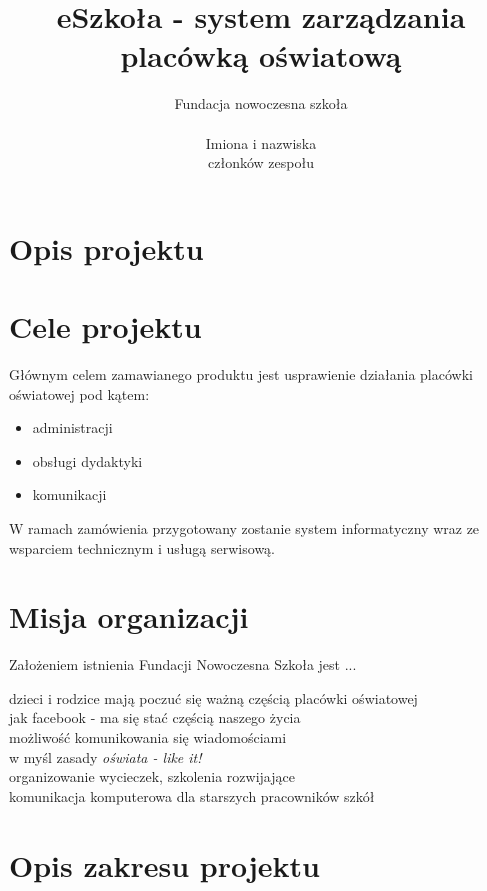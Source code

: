 \documentclass{article}
\author{Fundacja nowoczesna szkoła\\\\
Imiona i nazwiska\\członków zespołu} %
\title{eSzkoła - system zarządzania placówką oświatową}
\begin{document}
\maketitle
\newpage
\tableofcontents
\newpage

\section{Opis projektu}

\section{Cele projektu}
Głównym celem zamawianego produktu jest usprawienie działania placówki oświatowej pod kątem:
\begin{itemize}
    \item administracji
    \item obsługi dydaktyki
    \item komunikacji
\end{itemize}

W ramach zamówienia przygotowany zostanie system informatyczny wraz ze wsparciem technicznym i usługą serwisową.


\section{Misja organizacji}
Założeniem istnienia Fundacji Nowoczesna Szkoła jest ... %

dzieci i rodzice mają poczuć się ważną częścią placówki oświatowej\\
jak facebook - ma się stać częścią naszego życia\\
możliwość komunikowania się wiadomościami\\
w myśl zasady \textit{ oświata - like it!}\\
organizowanie wycieczek, szkolenia rozwijające \\
komunikacja komputerowa dla starszych pracowników szkół

\section{Opis zakresu projektu}
\end{document}
